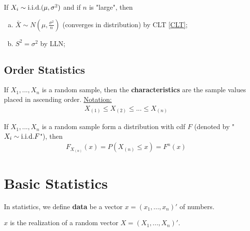 \documentclass[11pt]{elegantbook}
\begin{document}
\begin{theorem}["Asymptotics"]
    If $X_i\sim \textnormal{i.i.d.} (\mu,\sigma^2)$ and if $n$ is "large", then
    \begin{enumerate}[(a).]
        \item $\bar{X}\sim N(\mu,\frac{\sigma^2}{n})$ (converges in distribution) by CLT \ref{CLT};
        \item $S^2=\sigma^2$ by LLN;
    \end{enumerate}
\end{theorem}

\subsection{Order Statistics}
\begin{definition}
    \normalfont
    If $X_1,...,X_n$ is a random sample, then the \textbf{characteristics} are the sample values placed in ascending order.
    \underline{Notation:}
    \begin{equation}
        \begin{aligned}
            X_{(1)}\leq X_{(2)}\leq ... \leq X_{(n)}
        \end{aligned}
        \nonumber
    \end{equation}
\end{definition}

\begin{proposition}[Distribution of $X_{n}=\max_{i=1,...,n}X_i$]
    If $X_1,...,X_n$ is a random sample form a distribution with cdf $F$ (denoted by "$X_i\sim \textnormal{i.i.d.} F$"), then
    \begin{equation}
        \begin{aligned}
            F_{X_{(n)}}(x)=P(X_{(n)}\leq x)=F^n(x)
        \end{aligned}
        \nonumber
    \end{equation}
\end{proposition}


\section{Basic Statistics}
In statistics, we define \textbf{data} be a vector $x=(x_1,...,x_n)'$ of numbers.
\begin{assumption}
    $x$ is the realization of a random vector $X=(X_1,...,X_n)'$.
\end{assumption}
\end{document}
